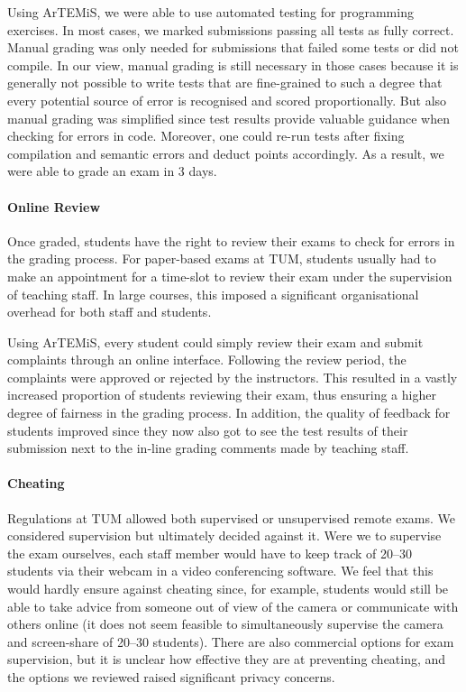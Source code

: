 Using ArTEMiS, we were able to use automated testing for programming exercises.
In most cases, we marked submissions passing all tests as fully correct.
Manual grading was only needed for submissions that failed some tests or did not compile.
In our view, manual grading is still necessary in those cases because it is generally not possible to write tests that are fine-grained to such a degree that every potential source of error is recognised and scored proportionally.
But also manual grading was simplified since test results provide valuable guidance when checking for errors in code.
Moreover, one could re-run tests after fixing compilation and semantic errors and deduct points accordingly.
As a result, we were able to grade an exam in 3 days.

\paragraph{Online Review}
Once graded, students have the right to review their
exams to check for errors in the grading process.
For paper-based exams at TUM, students usually had to make an
appointment for a time-slot to review their exam under
the supervision of teaching staff.
In large courses, this imposed a significant organisational overhead for both staff and students.

Using ArTEMiS, every student could simply review their exam and submit complaints through an online interface.
Following the review period,
the complaints were approved or rejected by the instructors.
This resulted in a vastly increased proportion of students reviewing their exam,
thus ensuring a higher degree of fairness in the grading process.
In addition, the quality of feedback for students improved
since
they now also got to see the test results of their submission next to the in-line grading comments made by teaching staff.

\paragraph{Cheating}

Regulations at TUM allowed both supervised or unsupervised remote exams.
We considered supervision but ultimately decided against it. Were we to supervise the exam ourselves,
each staff member would have to keep track of 20--30 students via their webcam in a video conferencing software.
We feel that this would hardly ensure against cheating
since, for example, students would still be able to take advice from someone out of view of the camera or communicate with others online (it does not seem feasible to simultaneously supervise the camera and screen-share of 20--30 students).
There are also commercial options for exam supervision,
but it is unclear how effective they are at preventing cheating, and the options we reviewed raised significant privacy concerns.

